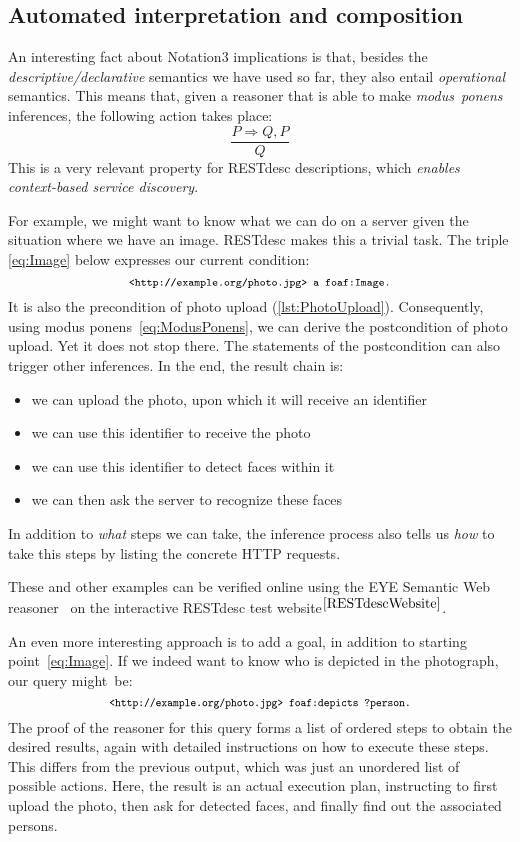 \documentclass[runningheads,a4paper, twocolumn]{llncs}
\begin{document}
\subsection{Automated interpretation and composition}
\label{Composition}
An interesting fact about Notation3 implications is that, besides the \emph{descriptive/declarative} semantics we have used so far, they also entail \emph{operational} semantics. This means that, given a reasoner that is able to make \emph{modus~ponens} inferences, the following action takes place:
\begin{equation}\label{eq:ModusPonens}
    \frac{P \Rightarrow Q, P}{Q}
\end{equation}
This is a very relevant property for RESTdesc descriptions, which \emph{enables context-based service discovery}.

For example, we might want to know what we can do on a server given the situation where we have an image. RESTdesc makes this a trivial task. The triple \ref{eq:Image} below expresses our current condition:
\begin{equation} \label{eq:Image}
    {\fontsize{8}{10}\texttt{<http://example.org/photo.jpg> a foaf:Image.}}
\end{equation}
It is also the precondition of photo upload (\autoref{lst:PhotoUpload}). Consequently, using modus ponens~\ref{eq:ModusPonens}, we can derive the postcondition of photo upload. Yet it does not stop there. The statements of the postcondition can also trigger other inferences. In the end, the result chain is:
\begin{itemize}
\item we can upload the photo, upon which it will receive an identifier
\item we can use this identifier to receive the photo
\item we can use this identifier to detect faces within it
\item we can then ask the server to recognize these faces
\end{itemize}
In addition to \emph{what} steps we can take, the inference process also tells us \emph{how} to take this steps by listing the concrete HTTP requests.

These and other examples can be verified online using the EYE Semantic Web reasoner~\cite{Euler} on the interactive RESTdesc test website$^{\ref{RESTdescWebsite}}$.

An even more interesting approach is to add a goal, in addition to starting point~\ref{eq:Image}. If we indeed want to know who is depicted in the photograph, our query might~be:
\begin{equation*}
    \fontsize{7.8}{10}\texttt{<http://example.org/photo.jpg> foaf:depicts ?person.}
\end{equation*}
The proof of the reasoner for this query forms a list of ordered steps to obtain the desired results, again with detailed instructions on how to execute these steps. This differs from the previous output, which was just an unordered list of possible actions. Here, the result is an actual execution plan, instructing to first upload the photo, then ask for detected faces, and finally find out the associated persons.
\end{document}
